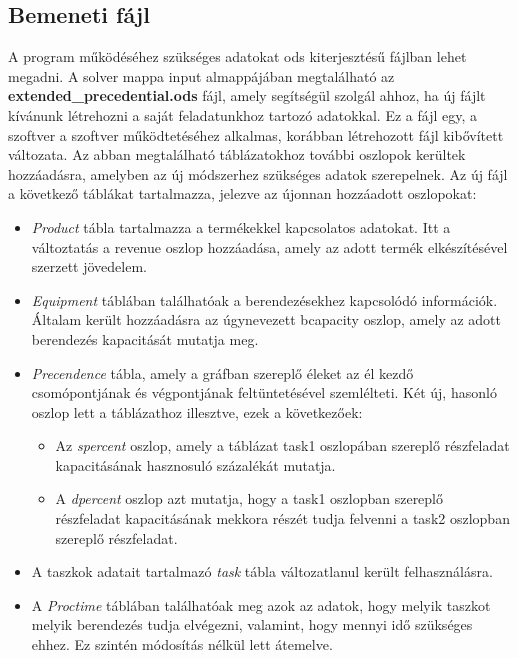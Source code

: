 \subsection{Bemeneti fájl}
A program működéséhez szükséges adatokat ods kiterjesztésű fájlban lehet megadni.
A solver mappa input almappájában megtalálható az \textbf{extended\_precedential.ods} fájl, amely segítségül szolgál ahhoz, ha új fájlt kívánunk létrehozni a saját feladatunkhoz tartozó adatokkal.
Ez a fájl egy, a szoftver a szoftver működtetéséhez alkalmas, korábban létrehozott fájl kibővített változata.
Az abban megtalálható táblázatokhoz további oszlopok kerültek hozzáadásra, amelyben az új módszerhez szükséges adatok szerepelnek.
Az új fájl a következő táblákat tartalmazza, jelezve az újonnan hozzáadott oszlopokat:
\begin{itemize}
  \item \textit{Product} tábla tartalmazza a termékekkel kapcsolatos adatokat.
  Itt a változtatás a revenue oszlop hozzáadása, amely az adott termék elkészítésével szerzett jövedelem.
  \item \textit{Equipment} táblában találhatóak a berendezésekhez kapcsolódó információk.
  Általam került hozzáadásra az úgynevezett b\textunderscore capacity oszlop, amely az adott berendezés kapacitását mutatja meg.
  \item \textit{Precendence} tábla, amely a gráfban szereplő éleket az él kezdő csomópontjának és végpontjának feltüntetésével szemlélteti.
  Két új, hasonló oszlop lett a táblázathoz illesztve, ezek a következőek:
  	\begin{itemize}
  		\item Az \textit{s\textunderscore percent} oszlop, amely a táblázat task1 oszlopában szereplő részfeladat kapacitásának hasznosuló százalékát mutatja.
  		\item A \textit{d\textunderscore percent} oszlop  azt mutatja, hogy a task1 oszlopban szereplő részfeladat kapacitásának mekkora részét tudja felvenni a task2 oszlopban szereplő részfeladat.
  	\end{itemize}
  	\item A taszkok adatait tartalmazó \textit{task} tábla változatlanul került felhasználásra.
  	\item A \textit{Proctime} táblában találhatóak meg azok az adatok, hogy melyik taszkot melyik berendezés tudja elvégezni, valamint, hogy mennyi idő szükséges ehhez.
  	Ez szintén módosítás nélkül lett átemelve.
\end{itemize}

